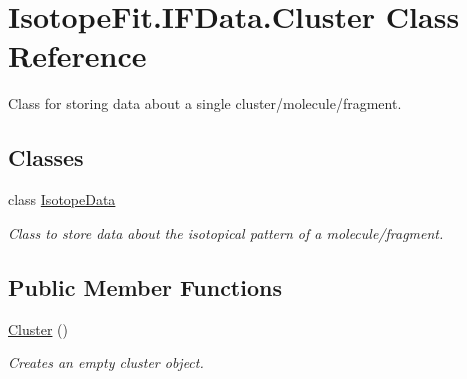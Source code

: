 \hypertarget{class_isotope_fit_1_1_i_f_data_1_1_cluster}{}\section{Isotope\+Fit.\+I\+F\+Data.\+Cluster Class Reference}
\label{class_isotope_fit_1_1_i_f_data_1_1_cluster}


Class for storing data about a single cluster/molecule/fragment.  


\subsection*{Classes}
\begin{DoxyCompactItemize}
\item 
class \hyperlink{class_isotope_fit_1_1_i_f_data_1_1_cluster_1_1_isotope_data}{Isotope\+Data}
\begin{DoxyCompactList}\small\item\em Class to store data about the isotopical pattern of a molecule/fragment. \end{DoxyCompactList}\end{DoxyCompactItemize}
\subsection*{Public Member Functions}
\begin{DoxyCompactItemize}
\item 
\hyperlink{class_isotope_fit_1_1_i_f_data_1_1_cluster_ada019f0710b46fddad5f74a541deb4da}{Cluster} ()
\begin{DoxyCompactList}\small\item\em Creates an empty cluster object. \end{DoxyCompactList}\end{DoxyCompactItemize}
